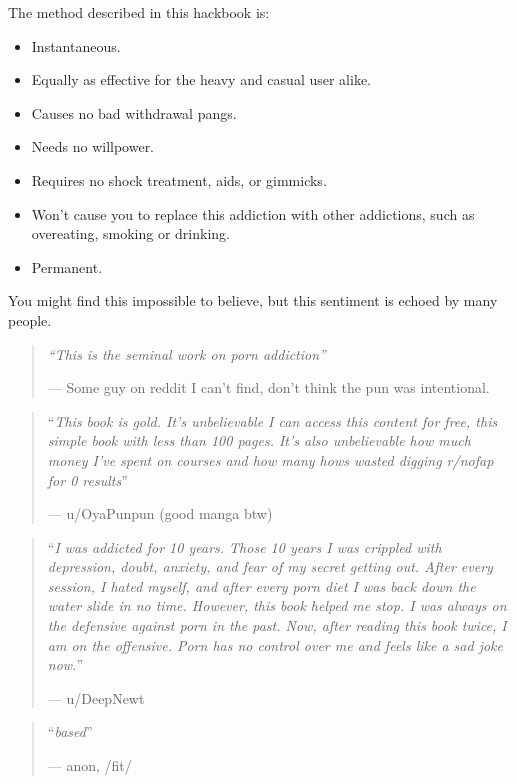 \documentclass[
]{book}
\begin{document}
The method described in this hackbook is:

\begin{itemize}
\item
  Instantaneous.
\item
  Equally as effective for the heavy and casual user alike.
\item
  Causes no bad withdrawal pangs.
\item
  Needs no willpower.
\item
  Requires no shock treatment, aids, or gimmicks.
\item
  Won't cause you to replace this addiction with other addictions, such as overeating, smoking or drinking.
\item
  Permanent.
\end{itemize}

You might find this impossible to believe, but this sentiment is echoed by many people.

\begin{quote}
\emph{``This is the seminal work on porn addiction''}

--- Some guy on reddit I can't find, don't think the pun was intentional.
\end{quote}

\begin{quote}
``\emph{This book is gold. It's unbelievable I can access this content for free, this simple book with less than 100 pages. It's also unbelievable how much money I've spent on courses and how many hows wasted digging r/nofap for 0 results}''

--- u/OyaPunpun (good manga btw)
\end{quote}

\begin{quote}
``\emph{I was addicted for 10 years. Those 10 years I was crippled with depression, doubt, anxiety, and fear of my secret getting out. After every session, I hated myself, and after every porn diet I was back down the water slide in no time. However, this book helped me stop. I was always on the defensive against porn in the past. Now, after reading this book twice, I am on the offensive. Porn has no control over me and feels like a sad joke now.}''

--- u/DeepNewt
\end{quote}

\begin{quote}
``\emph{based}''

--- anon, /fit/
\end{quote}
\end{document}
